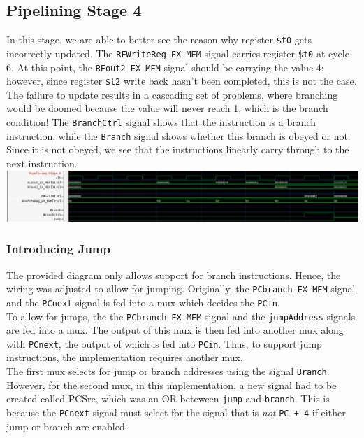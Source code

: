 \documentclass[twocolumn]{article}
\newcommand{\cc}[1]{\texttt{#1}}
\begin{document}
\subsection{Pipelining Stage 4}

In this stage, we are able to better see the reason why register \cc{\$t0} gets incorrectly updated. The \cc{RFWriteReg-EX-MEM} signal carries register \cc{\$t0} at cycle 6. At this point, the \cc{RFout2-EX-MEM} signal should be carrying the value 4; however, since register \cc{\$t2} write back hasn't been completed, this is not the case. The failure to update results in a cascading set of problems, where branching would be doomed because the value will never reach 1, which is the branch condition! The \cc{BranchCtrl} signal shows that the instruction is a branch instruction, while the \cc{Branch} signal shows whether this branch is obeyed or not. Since it is not obeyed, we see that the instructions linearly carry through to the next instruction. \\

\begingroup
    \centering
    \medskip
    \includegraphics[width=\columnwidth]{Lab-Tex/Lab6-images/p5.png}
    \medskip
\endgroup

\subsubsection{Introducing Jump}

The provided diagram only allows support for branch instructions. Hence, the wiring was adjusted to allow for jumping. Originally, the \cc{PCbranch-EX-MEM} signal and the \cc{PCnext} signal is fed into a mux which decides the \cc{PCin}. \\

To allow for jumps, the the \cc{PCbranch-EX-MEM} signal and the \cc{jumpAddress} signals are fed into a mux. The output of this mux is then fed into another mux along with \cc{PCnext}, the output of which is fed into \cc{PCin}. Thus, to support jump instructions, the implementation requires another mux. \\

The first mux selects for jump or branch addresses using the signal \cc{Branch}. However, for the second mux, in this implementation, a new signal had to be created called PCSrc, which was an OR beteween \cc{jump} and \cc{branch}. This is because the \cc{PCnext} signal must select for the signal that is \textit{not} \cc{PC + 4} if either jump or branch are enabled. \\
\end{document}
